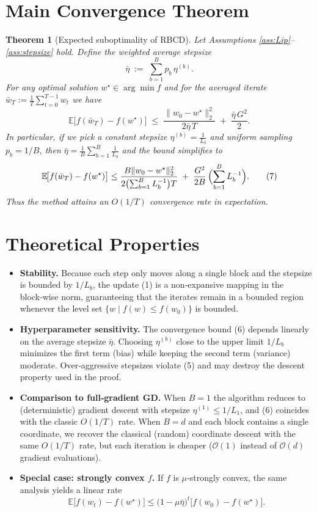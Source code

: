 \documentclass{article}
\newtheorem{theorem}{Theorem}
\newcommand{\E}{\mathbb{E}}
\begin{document}
\section*{Main Convergence Theorem}
\begin{theorem}[Expected suboptimality of RBCD]\label{thm:conv}
Let Assumptions \ref{ass:Lip}–\ref{ass:stepsize} hold.
Define the weighted average stepsize
\[
\bar\eta \;:=\;\sum_{b=1}^{B}p_{b}\,\eta^{(b)} .
\]
For any optimal solution $w^{\star}\in\arg\min f$ and for the averaged iterate
$\displaystyle\bar w_{T}:=\frac{1}{T}\sum_{t=0}^{T-1}w_{t}$ we have
\[
\boxed{
\E\!\bigl[f(\bar w_{T})-f(w^{\star})\bigr]\;\le\;
\frac{\|w_{0}-w^{\star}\|_{2}^{2}}{2\bar\eta\,T}
\;+\;
\frac{\bar\eta\,G^{2}}{2}.
}
\tag{6}
\]
In particular, if we pick a constant stepsize
$\displaystyle\eta^{(b)}=\frac{1}{L_{b}}$ and uniform sampling $p_{b}=1/B$,
then $\bar\eta =\frac{1}{B}\sum_{b=1}^{B}\frac{1}{L_{b}}$ and the bound simplifies to
\[
\E\!\bigl[f(\bar w_{T})-f(w^{\star})\bigr]\le
\frac{B\|w_{0}-w^{\star}\|_{2}^{2}}{2\bigl(\sum_{b=1}^{B}L_{b}^{-1}\bigr)T}
\;+\;
\frac{G^{2}}{2B}\,\Bigl(\sum_{b=1}^{B}L_{b}^{-1}\Bigr).
\tag{7}
\]
Thus the method attains an $O(1/T)$ convergence rate in expectation.
\end{theorem}

\section*{Theoretical Properties}
\begin{itemize}[leftmargin=*]
\item \textbf{Stability.} Because each step only moves along a single block and the stepsize is bounded by $1/L_{b}$, the update (1) is a non‑expansive mapping in the block‑wise norm, guaranteeing that the iterates remain in a bounded region whenever the level set $\{w\mid f(w)\le f(w_{0})\}$ is bounded.

\item \textbf{Hyperparameter sensitivity.} The convergence bound (6) depends linearly on the average stepsize $\bar\eta$.
Choosing $\eta^{(b)}$ close to the upper limit $1/L_{b}$ minimizes the first term (bias) while keeping the second term (variance) moderate. Over‑aggressive stepsizes violate (5) and may destroy the descent property used in the proof.

\item \textbf{Comparison to full‑gradient GD.}
When $B=1$ the algorithm reduces to (deterministic) gradient descent with stepsize $\eta^{(1)}\le 1/L_{1}$, and (6) coincides with the classic $O(1/T)$ rate.  
When $B=d$ and each block contains a single coordinate, we recover the classical (random) coordinate descent with the same $O(1/T)$ rate, but each iteration is cheaper ($\mathcal O(1)$ instead of $\mathcal O(d)$ gradient evaluations).

\item \textbf{Special case: strongly convex $f$.}
If $f$ is $\mu$‑strongly convex, the same analysis yields a linear rate
\[
\E\!\bigl[f(w_{t})-f(w^{\star})\bigr]\le
\bigl(1-\mu\bar\eta\bigr)^{t}\bigl[f(w_{0})-f(w^{\star})\bigr].
\]
\end{itemize}
\end{document}
